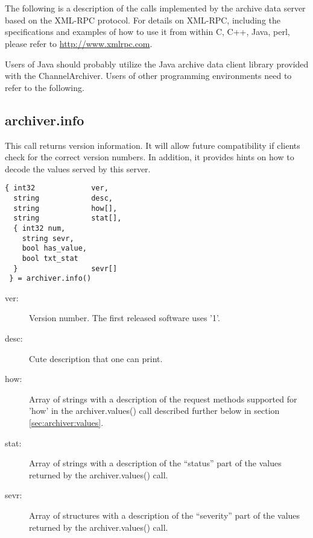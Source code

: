 \section{} \label{sec:xmlprotocol}
The following is a description of the calls implemented by the archive
data server based on the XML-RPC protocol.
For details on XML-RPC,  including the specifications and examples of
how to use it from within C,  C++, Java, perl, please refer to
\href{http://www.xmlrpc.com}{http://www.xmlrpc.com}.

Users of Java should probably utilize the Java archive data client
library provided with the ChannelArchiver. Users of other programming
environments need to refer to the following.

\subsection{archiver.info} \label{sec:archiver:info} %
This call returns version information. It will allow future
compatibility if clients check for the correct version numbers.  In
addition, it provides hints on how to decode the values served by this
server.

\begin{lstlisting}[keywordstyle=\sffamily]
{ int32             ver,
  string            desc,
  string            how[],
  string            stat[],
  { int32 num,
    string sevr,
    bool has_value,
    bool txt_stat
  }                 sevr[]
 } = archiver.info()
\end{lstlisting}

\begin{description}
\item[\sffamily ver:]  Version number. The first released software uses '1'.
\item[\sffamily desc:] Cute description that one can print.
\item[\sffamily how:]  Array of strings with a description of the
                       request methods supported for 'how' in the
		       archiver.values() call described further below in
                       section \ref{sec:archiver:values}.
\item[\sffamily stat:] Array of strings with a description of the
                       ``status'' part of the values returned by
                       the archiver.values() call.     
\item[\sffamily sevr:] Array of structures with a description of the
                       ``severity'' part of the values returned by
                       the archiver.values() call.     
\end{description}

